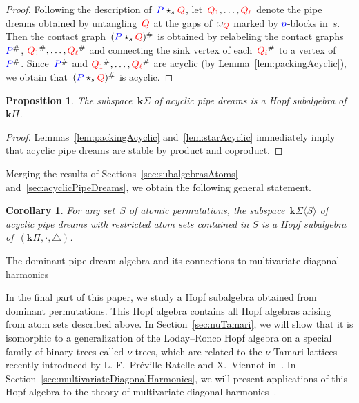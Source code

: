 \documentclass{amsart}
\makeatletter
\newtheorem{corollary}[theorem]{Corollary}
\newtheorem{proposition}[theorem]{Proposition}
\theoremstyle{definition}
\newcommand{\bk}{\mathbf{k}} %
\renewcommand{\b}[1]{{\color{blue} #1}} %
\renewcommand{\r}[1]{{\color{red} #1}} %
\newcommand{\pipeDreams}{\Pi} %
\newcommand{\HP}{{\bk\pipeDreams}} %
\newcommand{\contact}{^\#} %
\newcommand{\HA}{{\bk\acyclicPipeDreams}} %
\newcommand{\acyclicPipeDreams}{\Sigma} %
\newcommand{\product}{\cdot} %
\newcommand{\coproduct}{\triangle} %
\def\part{\@startsection{part}{1}%
\z@{.7\linespacing\@plus\linespacing}{.8\linespacing}%
{\LARGE\sffamily\centering}}
\makeatother
\begin{document}
\begin{proof}
Following the description of~$\b{P} \star_{s} \r{Q}$, let~$\r{Q_1}, \dots, \r{Q_\ell}$ denote the pipe dreams obtained by untangling~$\r{Q}$ at the gaps of~$\omega_\r{Q}$ marked by $\b{p}$-blocks in~$s$. Then the contact graph~$(\b{P} \star_{s} \r{Q})\contact$ is obtained by relabeling the contact graphs~$\b{P}\contact$, $\r{Q_1}\contact, \dots, \r{Q_\ell}\contact$ and connecting the sink vertex of each~$\r{Q_i}\contact$ to a vertex of~$\b{P}\contact$. Since~$\b{P}\contact$ and $\r{Q_1}\contact, \dots, \r{Q_\ell}\contact$ are acyclic (by Lemma~\ref{lem:packingAcyclic}), we obtain that~$(\b{P} \star_{s} \r{Q})\contact$ is acyclic. 
\end{proof}

\begin{proposition}
The subspace~$\HA$ of acyclic pipe dreams is a Hopf subalgebra of~$\HP$.
\end{proposition}

\begin{proof}
Lemmas~\ref{lem:packingAcyclic} and~\ref{lem:starAcyclic} immediately imply that acyclic pipe dreams are stable by product and coproduct.
\end{proof}

Merging the results of Sections~\ref{sec:subalgebrasAtoms} and~\ref{sec:acyclicPipeDreams}, we obtain the following general statement.

\begin{corollary}
For any set~$S$ of atomic permutations, the subspace~$\HA \langle S \rangle$ of acyclic pipe dreams with restricted atom sets contained in $S$ is a Hopf subalgebra of~$(\HP, \product, \coproduct)$.
\end{corollary}


\part{The dominant pipe dream algebra and its connections to multivariate diagonal harmonics}
\label{part:multivariateDiagonalHarmonics}

In the final part of this paper, we study a Hopf subalgebra obtained from dominant permutations. 
This Hopf algebra contains all Hopf algebras arising from atom sets described above. 
In Section~\ref{sec:nuTamari}, we will show that it is isomorphic to a generalization of the Loday--Ronco Hopf algebra on a special 
family of binary trees called $\nu$-trees, which are related to the $\nu$-Tamari lattices recently introduced 
by L.-F.~Pr\'eville-Ratelle and X.~Viennot in~\cite{PrevilleRatelleViennot}. In Section~\ref{sec:multivariateDiagonalHarmonics}, 
we will present applications of this Hopf algebra to the theory of multivariate diagonal harmonics~\cite{Bergeron-multivariateDiagonalCoinvariantSpaces}.
\end{document}
